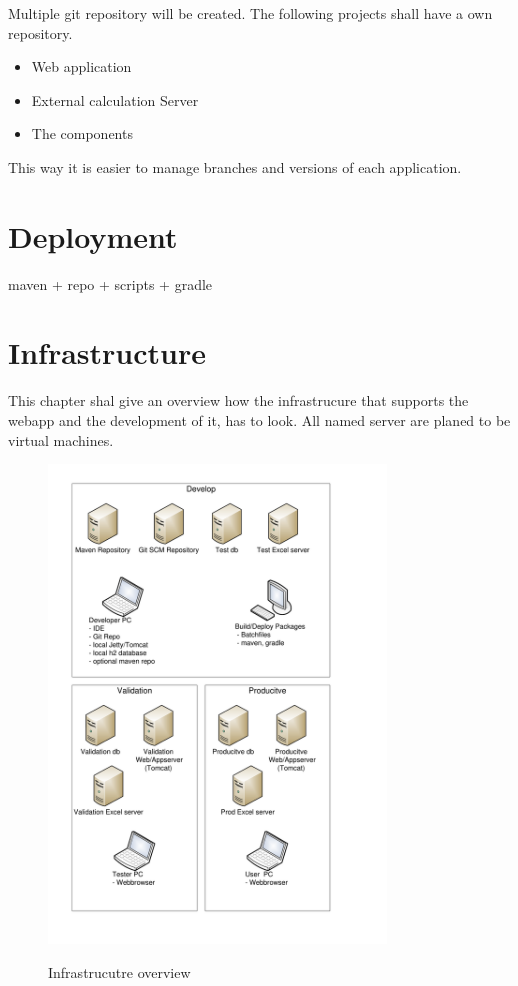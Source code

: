 \documentclass[paper=a4,twoside=false,BCOR=0mm,DIV=calc,fontsize=12pt]{scrartcl}
\begin{document}
Multiple git repository will be created. The following projects shall have a own repository.
\begin{itemize}
 \item Web application
 \item External calculation Server
 \item The components
\end{itemize}

This way it is easier to manage branches and versions of each application.





\section{Deployment}

maven + repo + scripts + gradle


\section{Infrastructure}
This chapter shal give an overview how the infrastrucure that supports the webapp and the development of it, has to look. 
All named server are planed to be virtual machines.

\begin{figure}
    \begin{center}
       \includegraphics[width=0.8\textwidth]{./img/InfrastructureLayout.pdf}\\
    \end{center}
  \caption{Infrastrucutre overview}
  \label{infrastructureoverview}
\end{figure} 
\end{document}
